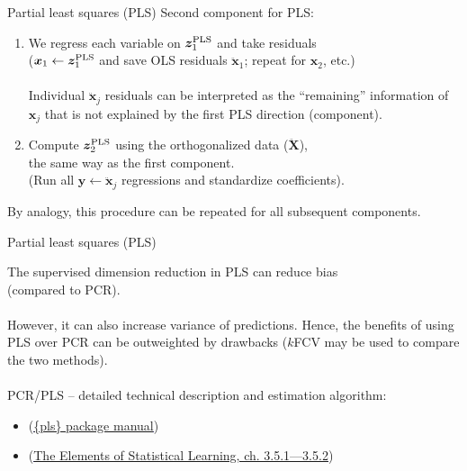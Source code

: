 \documentclass{beamer}
\begin{document}
\begin{frame}{Partial least squares (PLS)}
Second component for PLS:\\
\medskip
\begin{enumerate}
    \item We regress each variable on $\bm{z}_1^{\textnormal{PLS}}$ and take residuals \\($\bm{x}_1 \leftarrow \bm{z}_1^{\textnormal{PLS}}$ and save OLS residuals $\ddot{\bm{x}}_1$; repeat for $\bm{x}_2$, etc.)\\~\\
    Individual $\ddot{\bm{x}}_j$ residuals can be interpreted as the ``remaining'' information of $\bm{x}_j$ that is not explained by the first PLS direction (component).\\
    \medskip
    \item Compute $\bm{z}_2^{\textnormal{PLS}}$ using the orthogonalized data ($\ddot{\bm{X}}$), \\the same way as the first component.\\
    (Run all $\bm{y} \leftarrow \ddot{\bm{x}}_j$ regressions and standardize coefficients).
\end{enumerate}
\bigskip
By analogy, this procedure can be repeated for all subsequent components.
\end{frame}
\begin{frame}{Partial least squares (PLS)}

The supervised dimension reduction in PLS can reduce bias \\(compared to PCR). \\~\\However, it can also increase variance of predictions. Hence, the benefits of using PLS over PCR can be outweighted by drawbacks ($k$FCV may be used to compare the two methods).\\~\\

PCR/PLS -- detailed technical description and estimation algorithm:
\begin{itemize}
\item (\textcolor{blue}{\underline{\href{https://cran.r-project.org/web/packages/pls/vignettes/pls-manual.pdf}{\{pls\} package manual}}})
\item (\textcolor{blue}{\underline{\href{https://web.stanford.edu/~hastie/ElemStatLearn/}{The Elements of 
Statistical Learning, ch. 3.5.1---3.5.2}}})
\end{itemize}
\end{frame}
\end{document}
